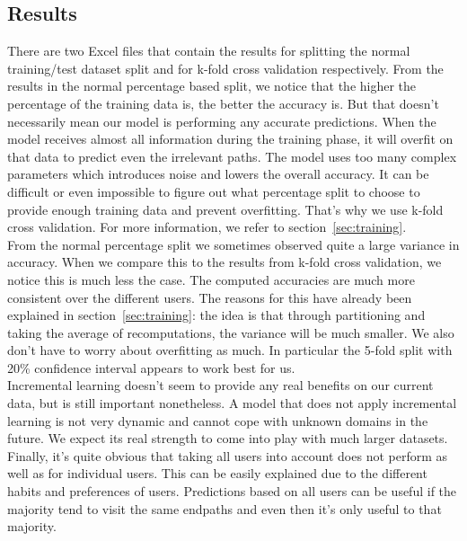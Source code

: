 \subsection{Results}\label{subsec:results}

There are two Excel files that contain the results for splitting the normal training/test dataset split and for k-fold cross validation respectively. From the results in the normal percentage based split, we notice that the higher the percentage of the training data is, the better the accuracy is. But that doesn't necessarily mean our model is performing any accurate predictions. When the model receives almost all information during the training phase, it will overfit on that data to predict even the irrelevant paths. The model uses too many complex parameters which introduces noise and lowers the overall accuracy. It can be difficult or even impossible to figure out what percentage split to choose to provide enough training data and prevent overfitting. That's why we use k-fold cross validation. For more information, we refer to section~\ref{sec:training}.
\\[2ex]
From the normal percentage split we sometimes observed quite a large variance in accuracy. When we compare this to the results from k-fold cross validation, we notice this is much less the case. The computed accuracies are much more consistent over the different users. The reasons for this have already been explained in section~\ref{sec:training}: the idea is that through partitioning and taking the average of recomputations, the variance will be much smaller. We also don't have to worry about overfitting as much. In particular the 5-fold split with 20\% confidence interval appears to work best for us.
\\[2ex]
Incremental learning doesn't seem to provide any real benefits on our current data, but is still important nonetheless. A model that does not apply incremental learning is not very dynamic and cannot cope with unknown domains in the future. We expect its real strength to come into play with much larger datasets.
\\[2ex]
Finally, it's quite obvious that taking all users into account does not perform as well as for individual users. This can be easily explained due to the different habits and preferences of users. Predictions based on all users can be useful if the majority tend to visit the same endpaths and even then it's only useful to that majority.
